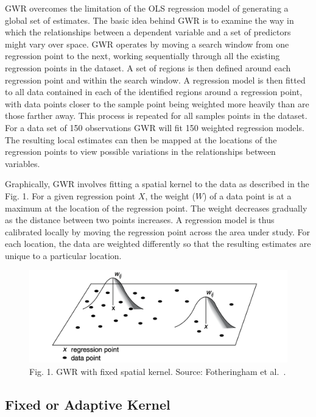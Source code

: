 \documentclass[
]{book}
\begin{document}
GWR overcomes the limitation of the OLS regression model of generating a global set of estimates. The basic idea behind GWR is to examine the way in which the relationships between a dependent variable and a set of predictors might vary over space. GWR operates by moving a search window from one regression point to the next, working sequentially through all the existing regression points in the dataset. A set of regions is then defined around each regression point and within the search window. A regression model is then fitted to all data contained in each of the identified regions around a regression point, with data points closer to the sample point being weighted more heavily than are those farther away. This process is repeated for all samples points in the dataset. For a data set of 150 observations GWR will fit 150 weighted regression models. The resulting local estimates can then be mapped at the locations of the regression points to view possible variations in the relationships between variables.

Graphically, GWR involves fitting a spatial kernel to the data as described in the Fig. 1. For a given regression point \(X\), the weight (\(W\)) of a data point is at a maximum at the location of the regression point. The weight decreases gradually as the distance between two points increases. A regression model is thus calibrated locally by moving the regression point across the area under study. For each location, the data are weighted differently so that the resulting estimates are unique to a particular location.

\begin{figure}
\centering
\includegraphics{figs/ch8/fixed_bandwidth.png}
\caption{Fig. 1. GWR with fixed spatial kernel. Source: Fotheringham et al.~\citeyearpar[p.45]{Fotheringham_et_al_2002_book}.}
\end{figure}

\hypertarget{fixed-or-adaptive-kernel}{%
\subsection{Fixed or Adaptive Kernel}\label{fixed-or-adaptive-kernel}}
\end{document}
